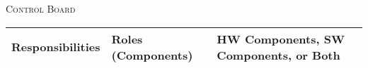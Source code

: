 \documentclass[RRC.tex]{subfiles}
\begin{document}
\bigskip

\begin{center}
	\textsc{\Large Control Board}
	\hrulefill
	\begin{tabular}{ | p{5cm} | p{5cm} | p{5cm} |}
		\hline
		Responsibilities & Roles (Components) & HW Components, SW Components, or Both \\ \hline		
	\end{tabular}
\end{center}
\end{document}
